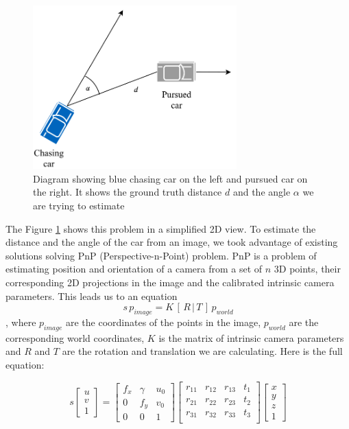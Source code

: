 \begin{figure}[h!]
    \centering
    \includegraphics[width=0.7\textwidth]{images/chasing_diagram.pdf}
    
    \caption{Diagram showing blue chasing car on the left and pursued car on the right. It shows the ground truth distance $d$ and the angle $\alpha$ we are trying to estimate }\label{f:chasing_diagram}
\end{figure}

The Figure \ref{f:chasing_diagram} shows this problem in a simplified 2D view. To estimate the distance and the angle of the car from an image, we took advantage of existing solutions solving PnP (Perspective-n-Point) problem. PnP is a problem of estimating position and orientation of a camera from a set of $n$ 3D points, their corresponding 2D projections in the image and the calibrated intrinsic camera parameters. This leads us to an equation 
\begin{equation}
s\,p_{image} = K\,[\,R\, |\, T\, ]\, p_{world}
\end{equation}
, where $p_{image}$
are the coordinates of the points in the image, $p_{world}$ are the corresponding world coordinates, $K$ is the matrix of intrinsic camera parameters and $R$ and $T$ are the rotation and translation we are calculating. Here is the full equation: 


\begin{equation}
s\begin{bmatrix}u\\v\\1\end{bmatrix} = \begin{bmatrix}
f_x & \gamma & u_0\\
0 & f_y & v_0\\
0 & 0 & 1
\end{bmatrix}\begin{bmatrix}
r_{11} & r_{12} & r_{13} & t_{1}\\
r_{21} & r_{22} & r_{23} & t_{2}\\
r_{31} & r_{32} & r_{33} & t_{3}\\
\end{bmatrix}
\begin{bmatrix}x\\y\\z\\1\end{bmatrix}
\end{equation}


